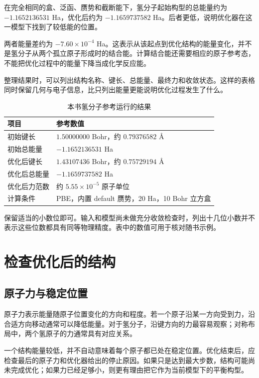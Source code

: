 在完全相同的盒、泛函、赝势和截断能下，氢分子起始构型的总能量约为 $-1.1652136531$ Ha，优化后约为 $-1.1659737582$ Ha。后者更低，说明优化器在这一模型下找到了较低能的位置。

两者能量差约为 $-7.60\times10^{-4}$ Ha。这表示从该起点到优化结构的能量变化，并不是氢分子从两个孤立原子形成时的结合能。计算结合能还需要相应的原子参考态，不能把优化过程中的能量下降当成化学反应能。

整理结果时，可以列出结构名称、键长、总能量、最终力和收敛状态。这样的表格同时保留几何与电子信息，比只列出能量更能说明优化过程发生了什么。

\begin{table}[htbp]
\centering
\caption{本书氢分子参考运行的结果}
\begin{tabularx}{\linewidth}{lX}
\toprule
项目 & 参考数值\\
\midrule
初始键长 & $1.50000000$ Bohr，约 $0.79376582$ Å\\
初始总能量 & $-1.1652136531$ Ha\\
优化后键长 & $1.43107436$ Bohr，约 $0.75729194$ Å\\
优化后总能量 & $-1.1659737582$ Ha\\
优化后力范数 & 约 $5.55\times10^{-5}$ 原子单位\\
计算条件 & PBE，内置 default 赝势，20 Ha，10 Bohr 立方盒\\
\bottomrule
\end{tabularx}
\end{table}

保留适当的小数位即可。输入和模型尚未做充分收敛检查时，列出十几位小数并不表示这些位数都具有同等物理精度。表中的数值可用于核对随书示例。

\section{检查优化后的结构}

\subsection{原子力与稳定位置}

原子力表示能量随原子位置变化的方向和程度。若一个原子沿某一方向受到力，沿合适方向移动通常可以降低能量。对于氢分子，沿键方向的力最容易观察；对称布局中，两个氢原子的力通常具有对应关系。

一个结构能量较低，并不自动意味着每个原子都已处在稳定位置。优化结束后，应检查最后的原子力和优化器给出的停止原因。如果只是达到最大步数，结构可能尚未完成优化；如果力已经足够小，则更有理由把它作为当前模型下的平衡构型。

